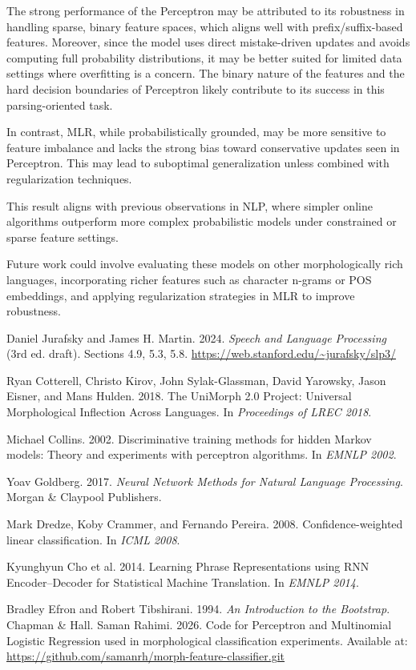 \documentclass[11pt]{article}
\begin{document}
The strong performance of the Perceptron may be attributed to its robustness in handling sparse, binary feature spaces, which aligns well with prefix/suffix-based features. Moreover, since the model uses direct mistake-driven updates and avoids computing full probability distributions, it may be better suited for limited data settings where overfitting is a concern. The binary nature of the features and the hard decision boundaries of Perceptron likely contribute to its success in this parsing-oriented task.

In contrast, MLR, while probabilistically grounded, may be more sensitive to feature imbalance and lacks the strong bias toward conservative updates seen in Perceptron. This may lead to suboptimal generalization unless combined with regularization techniques.

This result aligns with previous observations in NLP, where simpler online algorithms outperform more complex probabilistic models under constrained or sparse feature settings.

Future work could involve evaluating these models on other morphologically rich languages, incorporating richer features such as character n-grams or POS embeddings, and applying regularization strategies in MLR to improve robustness.


\clearpage

\begin{normalsize}
\begin{thebibliography}{9}

Daniel Jurafsky and James H. Martin. 2024. \textit{Speech and Language Processing} (3rd ed. draft). Sections 4.9, 5.3, 5.8. \url{https://web.stanford.edu/~jurafsky/slp3/}

Ryan Cotterell, Christo Kirov, John Sylak-Glassman, David Yarowsky, Jason Eisner, and Mans Hulden. 2018. The UniMorph 2.0 Project: Universal Morphological Inflection Across Languages. In \textit{Proceedings of LREC 2018}.

Michael Collins. 2002. Discriminative training methods for hidden Markov models: Theory and experiments with perceptron algorithms. In \textit{EMNLP 2002}.

Yoav Goldberg. 2017. \textit{Neural Network Methods for Natural Language Processing}. Morgan \& Claypool Publishers.

Mark Dredze, Koby Crammer, and Fernando Pereira. 2008. Confidence-weighted linear classification. In \textit{ICML 2008}.

Kyunghyun Cho et al. 2014. Learning Phrase Representations using RNN Encoder--Decoder for Statistical Machine Translation. In \textit{EMNLP 2014}.

Bradley Efron and Robert Tibshirani. 1994. \textit{An Introduction to the Bootstrap}. Chapman \& Hall.
Saman Rahimi. 2026. Code for Perceptron and Multinomial Logistic Regression used in morphological classification experiments. Available at: \url{https://github.com/samanrh/morph-feature-classifier.git}

\end{thebibliography}
\end{normalsize}
\end{document}
